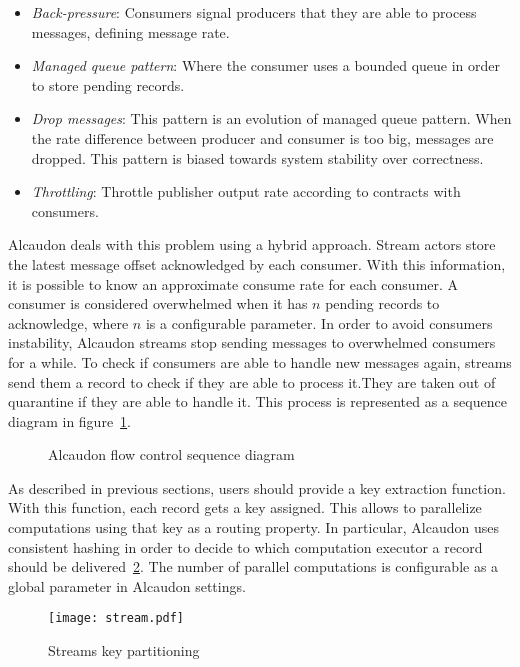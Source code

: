 \begin{itemize}
\item \textit{Back-pressure}: Consumers signal producers that they are able to
  process messages, defining message rate.
\item \textit{Managed queue pattern}: Where the consumer uses a bounded queue in
  order to store pending records.
\item \textit{Drop messages}: This pattern is an evolution of managed queue pattern. When
  the rate difference between producer and consumer is too big, messages are dropped.
  This pattern is biased towards system stability over correctness.
\item \textit{Throttling}: Throttle publisher output rate according to contracts
  with consumers.
\end{itemize}

Alcaudon deals with this problem using a hybrid approach. Stream actors store
the latest message offset acknowledged by each consumer. With this information, it
is possible to know an approximate consume rate for each consumer. A consumer is
considered overwhelmed when it has $n$ pending records to acknowledge, where $n$
is a configurable parameter. In order to avoid consumers instability, Alcaudon
streams stop sending messages to overwhelmed consumers for a while. To check if
consumers are able to handle new messages again, streams send them a record to
check if they are able to process it.They are taken out of quarantine if they
are able to handle it. This process is represented as a sequence diagram in
figure~\ref{fig:flowcontrol}.

\begin{figure}[!h]
  \centering
  \scalebox{0.5}{
    
  }
\caption{Alcaudon flow control sequence diagram}
\label{fig:flowcontrol}
\end{figure}

As described in previous sections, users should provide a key extraction
function. With this function, each record gets a key assigned. This allows to
parallelize computations using that key as a routing property. In particular,
Alcaudon uses consistent hashing in order to decide to which computation
executor a record should be delivered~\ref{fig:streamkeypart}. The number of
parallel computations is configurable as a global parameter in Alcaudon
settings.

\begin{figure}
  \centering
  \texttt{[image: stream.pdf]}
  \caption{Streams key partitioning}
  \label{fig:streamkeypart}
\end{figure}

